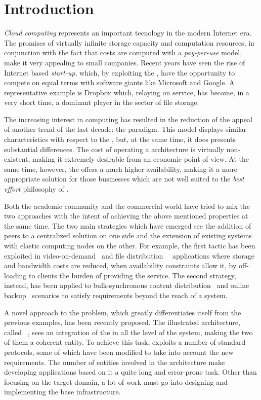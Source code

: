 \chapter{Introduction}
\textit{Cloud computing} represents an important tecnology in the
modern Internet era. The promises of virtually infinite storage
capacity and computation resources, in conjunction with the fact that
costs are computed with a \textit{pay-per-use} model, make it very
appealing to small companies. Recent years have seen the rise of Internet based
\textit{start-up}, which, by exploiting the \cloud, have the opportunity
to compete on equal terms with software giants like Microsoft
and Google. A representative example is Dropbox which, relaying on
\amazonsss service, has become, in a very short time, a dominant player
in the sector of file storage.

The increasing interest in \cloud computing has resulted in the
reduction of the appeal of another trend of the last decade: the \ptop
paradigm. This model displays similar characteristics with respect to
the \cloud, but, at the same time, it does presents substantial
differences. The
cost of operating a \ptop architecture is virtually non-existent,
making it extremely desirable from an economic point of view. At the
same time, however, the \cloud offers a much higher availability,
making it a more appropriate solution for those businesses which are not
well suited to the \textit{best effort} philosophy of \ptop.

Both the academic community and the commercial world have tried to mix
the two approaches with the intent of achieving the above mentioned
properties at the same time. The two main strategies which have
emerged see the
addition of peers to a centralized solution on one side and the
extension of existing \ptop systems with elastic computing nodes on
the other.
For example, the first tactic has been exploited in
video-on-demand~\cite{PeerAssistedVoD} and file
distribution~\cite{BitTorrentRobustness}~\cite{AmazingStore}
applications where storage
and bandwidth costs are reduced, when availability
constraints allow it, by off-loading to clients the burden of
providing the service. The second strategy, instead, has been applied
to bulk-synchronous content distribution~\cite{AngelsInCloud}
and online backup~\cite{PeerAssistedOnlineDataBackup} scenarios to
satisfy requirements beyond the reach of a \ptop system.

A novel approach to the problem, which greatly differentiates itself
from the previous examples, has been recently proposed. The
illustrated architecture, called \cloudcast~\cite{Cloudcast}, sees an
integration of the \cloud in all the level of the \ptop system, making
the two of them a coherent entity. To achieve this task, \cloudcast
exploits a number of standard \ptop protocols, some of which have been
modified to take into account the new requirements. The number of
entities involved in the architecture make developing applications
based on it a quite long and error-prone task. Other than focusing on
the target domain, a lot of work must go into designing and implementing
the base infrastructure.

